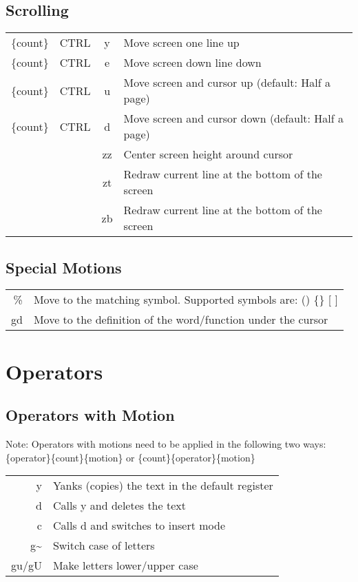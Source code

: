 \documentclass{article}
\begin{document}
\subsection{Scrolling}
\begin{tabular}{r r c l }
 \{count\} & CTRL & y & Move screen one line up\\[0.5ex]
 \{count\} & CTRL & e & Move screen down line down\\[0.5ex]
 \{count\} & CTRL & u & Move screen and cursor up (default: Half a page)\\[0.5ex]
 \{count\} & CTRL & d & Move screen and cursor down (default: Half a page)\\[0.5ex]
 & & zz & Center screen height around cursor\\[0.5ex]
 & & zt & Redraw current line at the bottom of the screen\\[0.5ex]
 & & zb & Redraw current line at the bottom of the screen\\[0.5ex]
\end{tabular}


\subsection{Special Motions}
\begin{tabular}{ r l }
 \% & Move to the matching symbol. Supported symbols are: () \{\} [ ] \\[0.5ex]
 gd & Move to the definition of the word/function under the cursor\\[0.5ex]
\end{tabular}

\pagebreak
\section{Operators}

\subsection{Operators with Motion} \label{Operators with Motion}
Note: Operators with motions need to be applied in the following two ways: \{operator\}\{count\}\{motion\} or
\{count\}\{operator\}\{motion\}

\vspace{3mm} 
\begin{tabular}{ r l }
 y & Yanks (copies) the text in the default register \\[0.5ex]
 d & Calls y and deletes the text \\[0.5ex]
 c & Calls d and switches to insert mode \\[0.5ex]
 g\~ & Switch case of letters\\[0.5ex]
 gu/gU & Make letters lower/upper case\\[0.5ex]
\end{tabular}
\end{document}
